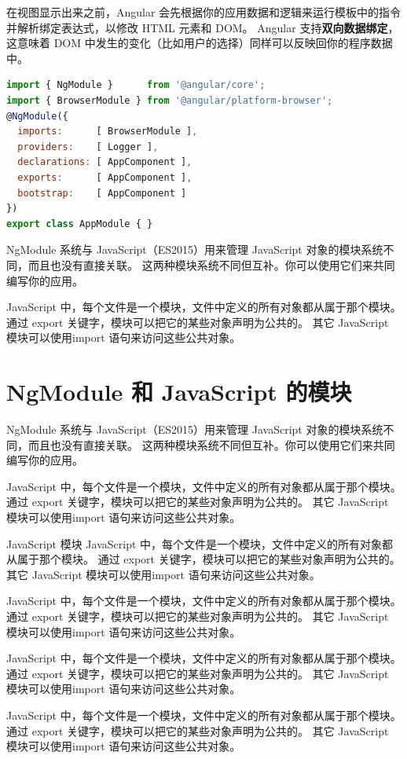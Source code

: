 \documentclass{progbookcn}
\begin{document}
在视图显示出来之前，Angular 会先根据你的应用数据和逻辑来运行模板中的指令并解析绑定表达式，以修改 HTML 元素和 DOM。 Angular 支持\textbf{双向数据绑定}，这意味着 DOM 中发生的变化（比如用户的选择）同样可以反映回你的程序数据中。

\begin{lstlisting}[language=JavaScript,caption={src/app/app.module.ts}]
import { NgModule }      from '@angular/core';
import { BrowserModule } from '@angular/platform-browser';
@NgModule({
  imports:      [ BrowserModule ],
  providers:    [ Logger ],
  declarations: [ AppComponent ],
  exports:      [ AppComponent ],
  bootstrap:    [ AppComponent ]
})
export class AppModule { }
\end{lstlisting}

NgModule 系统与 JavaScript（ES2015）用来管理 JavaScript 对象的模块系统不同，而且也没有直接关联。 这两种模块系统不同但互补。你可以使用它们来共同编写你的应用。

JavaScript 中，每个文件是一个模块，文件中定义的所有对象都从属于那个模块。 通过 export 关键字，模块可以把它的某些对象声明为公共的。 其它 JavaScript 模块可以使用import 语句来访问这些公共对象。


\clearpage

\section{NgModule 和 JavaScript 的模块}

NgModule 系统与 JavaScript（ES2015）用来管理 JavaScript 对象的模块系统不同，而且也没有直接关联。 这两种模块系统不同但互补。你可以使用它们来共同编写你的应用。

JavaScript 中，每个文件是一个模块，文件中定义的所有对象都从属于那个模块。 通过 export 关键字，模块可以把它的某些对象声明为公共的。 其它 JavaScript 模块可以使用import 语句来访问这些公共对象。


\begin{titledbox}{JavaScript 模块}
  JavaScript 中，每个文件是一个模块，文件中定义的所有对象都从属于那个模块。 通过 export 关键字，模块可以把它的某些对象声明为公共的。 其它 JavaScript 模块可以使用import 语句来访问这些公共对象。
  
  JavaScript 中，每个文件是一个模块，文件中定义的所有对象都从属于那个模块。 通过 export 关键字，模块可以把它的某些对象声明为公共的。 其它 JavaScript 模块可以使用import 语句来访问这些公共对象。
\end{titledbox}

\begin{information}
  JavaScript 中，每个文件是一个模块，文件中定义的所有对象都从属于那个模块。 通过 export 关键字，模块可以把它的某些对象声明为公共的。 其它 JavaScript 模块可以使用import 语句来访问这些公共对象。
  
  JavaScript 中，每个文件是一个模块，文件中定义的所有对象都从属于那个模块。 通过 export 关键字，模块可以把它的某些对象声明为公共的。 其它 JavaScript 模块可以使用import 语句来访问这些公共对象。
\end{information}
\end{document}
